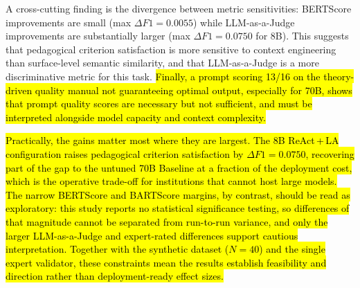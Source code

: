 \documentclass[conference,a4paper]{IEEEtran}
\begin{document}
A cross-cutting finding is the divergence 
between metric sensitivities: BERTScore 
improvements are small (max $\Delta F1 = 
0.0055$) while LLM-as-a-Judge improvements 
are substantially larger (max $\Delta F1 = 
0.0750$ for 8B). This suggests that 
pedagogical criterion satisfaction is more 
sensitive to context engineering than 
surface-level semantic similarity, and that 
LLM-as-a-Judge is a more discriminative 
metric for this task. \hl{Finally, a prompt scoring 13/16 on the
theory-driven quality manual
\mbox{\cite{jacobsen2025promises}} not guaranteeing
optimal output, especially for 70B, shows
that prompt quality scores are necessary but
not sufficient, and must be interpreted
alongside model capacity and context complexity.}

\hl{Practically, the gains matter most where they are
largest. The 8B ReAct\,+\,LA configuration raises
pedagogical criterion satisfaction by \mbox{$\Delta F1 =
0.0750$}, recovering part of the gap to the untuned
70B Baseline at a fraction of the deployment cost,
which is the operative trade-off for institutions
that cannot host large models.} \hl{The narrow BERTScore
and BARTScore margins, by contrast, should be read
as exploratory: this study reports no statistical
significance testing, so differences of that
magnitude cannot be separated from run-to-run
variance, and only the larger LLM-as-a-Judge and
expert-rated differences support cautious
interpretation. Together with the synthetic dataset
(\mbox{$N = 40$}) and the single expert validator, these
constraints mean the results establish feasibility
and direction rather than deployment-ready effect
sizes.}


\end{document}
